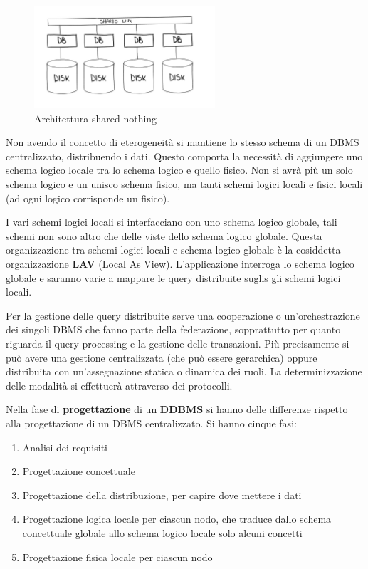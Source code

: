 \begin{figure}[ht]
    \centering
    \includegraphics[width=0.60\textwidth]{img/SharedNothing.jpg}
    \caption{Architettura shared-nothing}
    \label{fig:sharedNothing}
\end{figure}

Non avendo il concetto di eterogeneità si mantiene lo stesso schema di un DBMS
centralizzato, distribuendo i dati. Questo comporta la necessità di aggiungere
uno schema logico locale tra lo schema logico e quello fisico. Non si avrà più
un solo schema logico e un unisco schema fisico, ma tanti schemi logici locali e
fisici locali (ad ogni logico corrisponde un fisico).

I vari schemi logici locali si interfacciano con uno schema logico globale,
tali schemi non sono altro che delle viste dello schema logico globale. Questa
organizzazione tra schemi logici locali e schema logico globale è la cosiddetta
organizzazione \textbf{LAV} (Local As View). L'applicazione interroga
lo schema logico globale e saranno varie a mappare le query distribuite suglis gli schemi
logici locali.


Per la gestione delle query distribuite serve una cooperazione o un'orchestrazione
dei singoli DBMS che fanno parte della federazione, sopprattutto per quanto riguarda
il query processing e la gestione delle transazioni. Più precisamente si può avere
una gestione centralizzata (che può essere gerarchica) oppure distribuita con
un'assegnazione statica o dinamica dei ruoli. La determinizzazione delle modalità
si effettuerà attraverso dei protocolli.

Nella fase di \textbf{progettazione} di un \textbf{DDBMS} si hanno delle differenze rispetto alla
progettazione di un DBMS centralizzato. Si hanno cinque fasi:
\begin{enumerate}
    \item Analisi dei requisiti
    \item Progettazione concettuale
    \item Progettazione della distribuzione, per capire dove mettere i dati
    \item Progettazione logica locale per ciascun nodo, che traduce dallo schema concettuale
          globale allo schema logico locale solo alcuni concetti
    \item Progettazione fisica locale per ciascun nodo
\end{enumerate}

